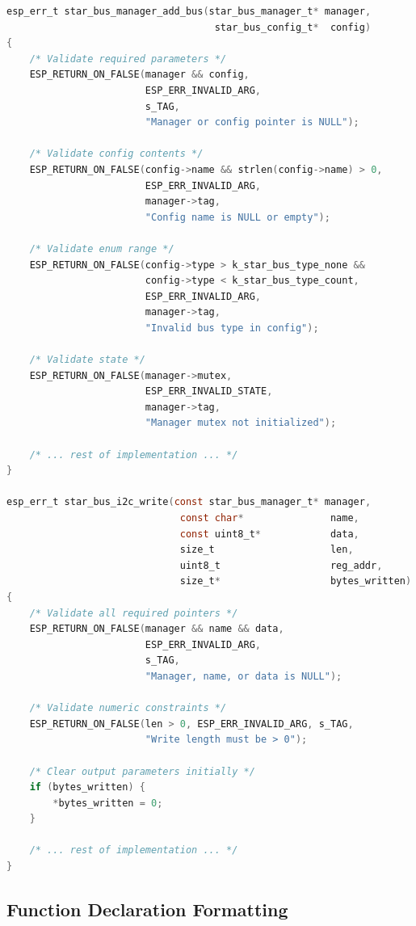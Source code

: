 \begin{lstlisting}[language=C]
esp_err_t star_bus_manager_add_bus(star_bus_manager_t* manager,
                                    star_bus_config_t*  config)
{
    /* Validate required parameters */
    ESP_RETURN_ON_FALSE(manager && config,
                        ESP_ERR_INVALID_ARG,
                        s_TAG,
                        "Manager or config pointer is NULL");

    /* Validate config contents */
    ESP_RETURN_ON_FALSE(config->name && strlen(config->name) > 0,
                        ESP_ERR_INVALID_ARG,
                        manager->tag,
                        "Config name is NULL or empty");

    /* Validate enum range */
    ESP_RETURN_ON_FALSE(config->type > k_star_bus_type_none &&
                        config->type < k_star_bus_type_count,
                        ESP_ERR_INVALID_ARG,
                        manager->tag,
                        "Invalid bus type in config");

    /* Validate state */
    ESP_RETURN_ON_FALSE(manager->mutex,
                        ESP_ERR_INVALID_STATE,
                        manager->tag,
                        "Manager mutex not initialized");

    /* ... rest of implementation ... */
}

esp_err_t star_bus_i2c_write(const star_bus_manager_t* manager,
                              const char*               name,
                              const uint8_t*            data,
                              size_t                    len,
                              uint8_t                   reg_addr,
                              size_t*                   bytes_written)
{
    /* Validate all required pointers */
    ESP_RETURN_ON_FALSE(manager && name && data,
                        ESP_ERR_INVALID_ARG,
                        s_TAG,
                        "Manager, name, or data is NULL");

    /* Validate numeric constraints */
    ESP_RETURN_ON_FALSE(len > 0, ESP_ERR_INVALID_ARG, s_TAG,
                        "Write length must be > 0");

    /* Clear output parameters initially */
    if (bytes_written) {
        *bytes_written = 0;
    }

    /* ... rest of implementation ... */
}
\end{lstlisting}

\subsection{Function Declaration Formatting}

